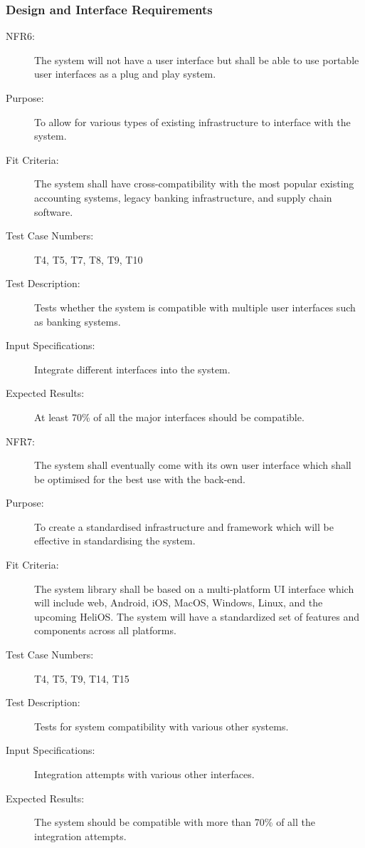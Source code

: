 \documentclass[a4paper,twoside,phd]{BYUPhys}
\begin{document}
\subsubsection{Design and Interface Requirements}
\begin{description}
\item[NFR6:] The system will not have a user interface but shall be able to use portable user interfaces as a plug and play system.
\item[Purpose:] To allow for various types of existing infrastructure to interface with the system.
\item[Fit Criteria:] The system shall have cross-compatibility with the most popular existing accounting systems, legacy banking infrastructure, and supply chain software.
\item[Test Case Numbers:] T4, T5, T7, T8, T9, T10
\item[Test Description:] Tests whether the system is compatible with multiple user interfaces such as banking systems.
\item[Input Specifications:] Integrate different interfaces into the system.
\item[Expected Results:] At least 70\% of all the major interfaces should be compatible.
\item[NFR7:] The system shall eventually come with its own user interface which shall be optimised for the best use with the back-end.
\item[Purpose:] To create a standardised infrastructure and framework which will be effective in standardising the system.
\item[Fit Criteria:] The system library shall be based on a multi-platform UI interface which will include web, Android, iOS, MacOS, Windows, Linux, and the upcoming HeliOS. The system will have a standardized set of features and components across all platforms. 
\item[Test Case Numbers:] T4, T5, T9, T14, T15 
\item[Test Description:] Tests for system compatibility with various other systems.
\item[Input Specifications:] Integration attempts with various other interfaces.
\item[Expected Results:] The system should be compatible with more than 70\% of all the integration attempts.


\end{description}
\end{document}
